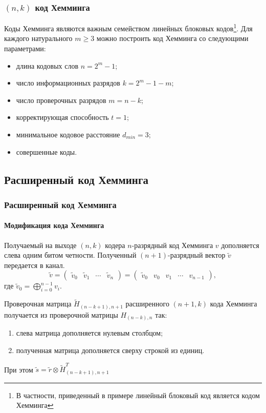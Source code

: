 \begin{frame}
    \frametitle{$(n,k)$ код Хемминга}
    Коды Хемминга являются важным семейством линейных блоковых кодов\footnote{В частности, приведенный в примере линейный блоковый код является кодом Хемминга}. Для каждого натурального $m\geq 3$ можно построить код Хемминга со следующими параметрами:
    
    \begin{itemize}
        \item длина кодовых слов $n = 2^m - 1$;
        \item число информационных разрядов $k = 2^m - 1 - m$;
        \item число проверочных разрядов $m = n - k$;
        \item корректирующая способность $t=1$;
        \item минимальное кодовое расстояние $d_{min}=3$;
        \item \alert{совершенные коды}.
    \end{itemize}
\end{frame}


\subsection{Расширенный код Хемминга}


\begin{frame}
    \frametitle{Расширенный код Хемминга}
    \framesubtitle{Модификация кода Хемминга}
    
    Получаемый на выходе $(n,k)$ кодера $n$-разрядный код Хемминга $v$ дополняется слева одним битом четности. Полученный $(n+1)$-разрядный вектор $\tilde{v}$ передается в канал.
    \[
        \tilde{v}=
        \begin{pmatrix}
            \tilde{v}_0&\tilde{v}_1&\cdots&\tilde{v}_n
        \end{pmatrix}
        =
        \begin{pmatrix}
            \tilde{v}_0&v_0&v_1&\cdots&v_{n-1}
        \end{pmatrix},
    \]
    где
    \(
        \tilde{v}_0=\bigoplus_{i=0}^{n-1}v_i.
    \)
    
    Проверочная матрица $\tilde{H}_{(n-k+1),n+1}$ расширенного $(n+1,k)$ кода Хемминга получается из проверочной матрицы $H_{(n-k),n}$ так:
    \begin{enumerate}
        \item слева матрица дополняется нулевым столбцом;
        \item полученная матрица дополняется сверху строкой из единиц.
    \end{enumerate}
    При этом $\tilde{s}=\tilde{r}\otimes \tilde{H}_{(n-k+1),n+1}^T$
\end{frame}


